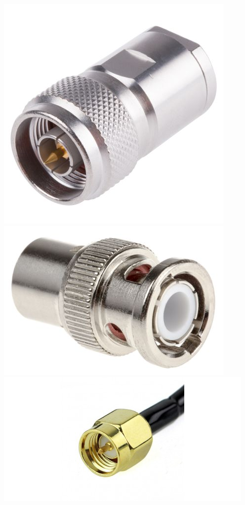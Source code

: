 \documentclass[a4paper,12pt]{report}            %
\begin{document}
\begin{center}
	\includegraphics[scale = 0.9]{pic/N.jpg}
	\includegraphics[scale = 0.9]{pic/BNC.jpg}
	\includegraphics[scale = 0.4]{pic/SMA.jpg}
\end{center}
\end{document}
